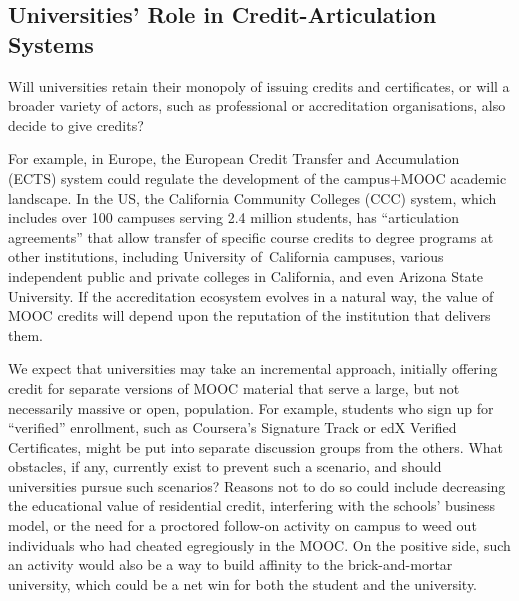 \subsection{Universities' Role in Credit-Articulation Systems}

Will  universities retain their monopoly
of issuing credits and certificates, or will a broader variety of actors,
such as professional or accreditation organisations, 
also decide to give credits?  

For example, in Europe, the European Credit Transfer and Accumulation
(ECTS) system could regulate the
development of the campus$+$MOOC academic landscape.  In the US, the
California Community Colleges (CCC) system, which includes over 100 campuses
serving 2.4 million students, has ``articulation agreements'' that allow
transfer of specific course credits to degree programs at other institutions,
including University of~California campuses, various independent public
and private colleges in California, and even Arizona State University.
If the accreditation ecosystem evolves in a natural
way, the value of MOOC credits will depend upon the reputation of the
institution that delivers them.

We expect that universities may take an
incremental approach, initially offering
credit for separate versions of MOOC material that serve a large, but
not necessarily massive or open, population.
For example, students who sign up for ``verified''
enrollment, such as Coursera's Signature Track or edX Verified
Certificates, might be put
into separate discussion groups from the others.  
What obstacles, if any, currently exist to prevent such a scenario, and
should universities pursue such scenarios?
Reasons not to do so could include decreasing the educational value of
residential credit, interfering with the schools' business model, or the
need for a proctored follow-on activity on campus to
weed out individuals who had cheated egregiously in the MOOC.  On the
positive side, such an activity would also be a way to build affinity to
the brick-and-mortar university, which could be a net win for both the
student and the university.
 


